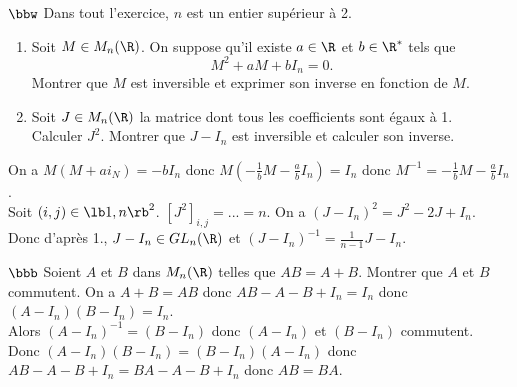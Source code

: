 \documentclass[11pt]{article}
\begin{document}
\vspace*{-0.2cm}

\begin{exercice}{$\bbw$}{}
    Dans tout l'exercice, $n$ est un entier supérieur à 2.
    \begin{enumerate}
        \item Soit $M\in M_n(\R)$. On suppose qu'il existe $a\in\R$ et $b\in\R^*$ tels que
        \begin{equation*}
            M^2 + aM + bI_n = 0.
        \end{equation*}
        Montrer que $M$ est inversible et exprimer son inverse en fonction de $M$.
        \item Soit $J\in M_n(\R)$ la matrice dont tous les coefficients sont égaux à 1.\\
        Calculer $J^2$. Montrer que $J-I_n$ est inversible et calculer son inverse.
    \end{enumerate}
    \tcblower
     On a $M(M+ai_N)=-bI_n$ donc $M(-\frac{1}{b}M-\frac{a}{b}I_n)=I_n$ donc $M^{-1}=-\frac{1}{b}M-\frac{a}{b}I_n$.\\
     Soit $(i,j)\in\lb1,n\rb^2$. $[J^2]_{i,j}=...=n$. On a $(J-I_n)^2=J^2-2J+I_n$.\\
    Donc d'après 1., $J-I_n\in GL_n(\R)$ et $(J-I_n)^{-1}=\frac{1}{n-1}J-I_n$.
\end{exercice}

\begin{exercice}{$\bbb$}{}
    Soient $A$ et $B$ dans $M_n(\R)$ telles que $AB=A+B$. Montrer que $A$ et $B$ commutent.
    \tcblower
    On a $A+B=AB$ donc $AB-A-B+I_n=I_n$ donc $(A-I_n)(B-I_n)=I_n$.\\
    Alors $(A-I_n)^{-1}=(B-I_n)$ donc $(A-I_n)$ et $(B-I_n)$ commutent.\\
    Donc $(A-I_n)(B-I_n)=(B-I_n)(A-I_n)$ donc $AB-A-B+I_n=BA-A-B+I_n$ donc $AB=BA$. 
\end{exercice}
\end{document}
